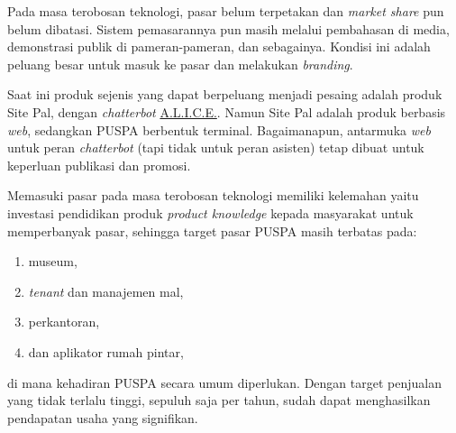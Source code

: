 Pada masa terobosan teknologi, pasar belum terpetakan dan \textit{market share} pun belum dibatasi. Sistem pemasarannya pun masih melalui pembahasan di media, demonstrasi publik di pameran-pameran, dan sebagainya. Kondisi ini adalah peluang besar untuk masuk ke pasar dan melakukan \textit{branding}.

Saat ini produk sejenis yang dapat berpeluang menjadi pesaing adalah produk Site Pal, dengan \textit{chatterbot} \href{http://alice.pandorabots.com}{A.L.I.C.E.}. Namun Site Pal adalah produk berbasis \textit{web}, sedangkan PUSPA berbentuk terminal.
Bagaimanapun, antarmuka \textit{web} untuk peran \textit{chatterbot} (tapi tidak untuk peran asisten) tetap dibuat untuk keperluan publikasi dan promosi.

Memasuki pasar pada masa terobosan teknologi memiliki kelemahan yaitu investasi pendidikan produk \textit{product knowledge} kepada masyarakat untuk memperbanyak pasar, sehingga target pasar PUSPA masih terbatas pada:
\begin{enumerate}
	\item museum,
	\item \textit{tenant} dan manajemen mal,
	\item perkantoran,
	\item dan aplikator rumah pintar,
\end{enumerate}
di mana kehadiran PUSPA secara umum diperlukan. Dengan target penjualan yang tidak terlalu tinggi, sepuluh saja per tahun, sudah dapat menghasilkan pendapatan usaha yang signifikan.


